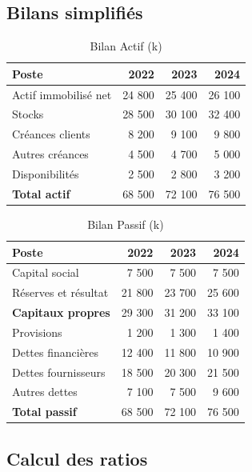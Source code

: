 \documentclass{rapportECL}
\begin{document}
\subsection{Bilans simplifiés}

\begin{table}[H]
\centering
\caption{Bilan Actif (k\text{\euro})}
\label{tab:bilan_actif}
\begin{tabular}{l r r r}
\toprule
\textbf{Poste} & \textbf{2022} & \textbf{2023} & \textbf{2024} \\
\midrule
Actif immobilisé net    & 24 800 & 25 400 & 26 100 \\
Stocks                  & 28 500 & 30 100 & 32 400 \\
Créances clients        & 8 200  & 9 100  & 9 800  \\
Autres créances         & 4 500  & 4 700  & 5 000  \\
Disponibilités          & 2 500  & 2 800  & 3 200  \\
\textbf{Total actif}    & 68 500 & 72 100 & 76 500 \\
\bottomrule
\end{tabular}
\end{table}

\begin{table}[H]
\centering
\caption{Bilan Passif (k\text{\euro})}
\label{tab:bilan_passif}
\begin{tabular}{l r r r}
\toprule
\textbf{Poste} & \textbf{2022} & \textbf{2023} & \textbf{2024} \\
\midrule
Capital social          & 7 500  & 7 500  & 7 500  \\
Réserves et résultat    & 21 800 & 23 700 & 25 600 \\
\textbf{Capitaux propres} & 29 300 & 31 200 & 33 100 \\
Provisions              & 1 200  & 1 300  & 1 400  \\
Dettes financières      & 12 400 & 11 800 & 10 900 \\
Dettes fournisseurs     & 18 500 & 20 300 & 21 500 \\
Autres dettes           & 7 100  & 7 500  & 9 600  \\
\textbf{Total passif}   & 68 500 & 72 100 & 76 500 \\
\bottomrule
\end{tabular}
\end{table}

\subsection{Calcul des ratios}
\end{document}
